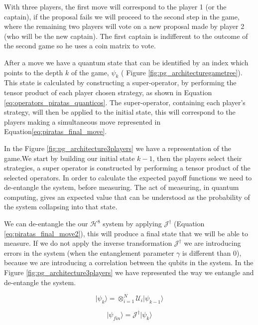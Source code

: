With three players, the first move will correspond to the player 1 (or the captain), if the proposal fails we will proceed to the second step in the game, where the remaining two players will vote on a new proposal made by player 2 (who will be the new captain). The first captain is indifferent to the outcome of the second game so he uses a coin matrix to vote.

After a move we have a quantum state that can be identified by an index which points to the depth $k$ of the game, $\psi_{k}$ ( Figure \ref{fig:pg_architecturegametree}). This state is calculated by constructing a super-operator, by performing the tensor product of each player chosen strategy, as shown in Equation \ref{eq:operators_piratas_quanticos}. The super-operator, containing each player's strategy, will then be applied to the initial state, this will correspond to the players making a simultaneous move represented in Equation\ref{eq:piratas_final_move}.

In the Figure \ref{fig:pg_architecture3players} we have a representation of the game.We start by building our initial state $k-1$, then the players  select their strategies, a super operator is constructed by performing a tensor product of the selected operators. In order to calculate the expected payoff functions we need to de-entangle the system, before measuring. The act of measuring, in quantum computing, gives an expected value that can be understood as the probability of the system collapsing into that state. 

We can de-entangle the our $\mathcal{H}^{8}$ system by applying $\mathcal{J}^{\dagger}$ (Equation \ref{eq:piratas_final_move2}), this will produce a final state that we will be able to measure. If we do not apply the inverse transformation $\mathcal{J}^{\dagger}$ we are introducing errors in the system (when the entanglement parameter $\gamma$ is different than $0$), because we are introducing a correlation between the qubits in the system. In the Figure \ref{fig:pg_architecture3players} we have represented the way we entangle and de-entangle the system.

\begin{equation}
\vert\psi_{k}\rangle=\otimes_{i=1}^{N} \mathcal{U}_{i}\vert\psi_{k-1}\rangle
\label{eq:piratas_final_move}
\end{equation}

\begin{equation}
\vert\psi_{fin}\rangle= \mathcal{J}^{\dagger}\vert\psi_{k}\rangle
\label{eq:piratas_final_move2}
\end{equation}

